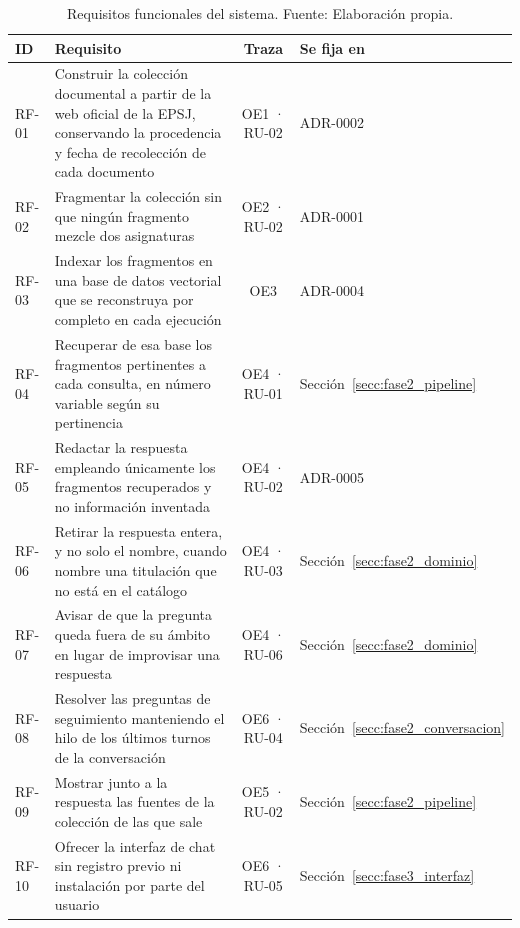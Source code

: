 \begin{table}[htbp]
  \centering
  \small
  \caption[Requisitos funcionales del sistema]{Requisitos funcionales del
    sistema. Fuente: Elaboración propia.}
  \label{tab:requisitos_funcionales}
  \begin{tabularx}{\textwidth}{@{}l >{\hsize}Y c >{\hsize}Y@{}}
    \toprule
    \textbf{ID} & \textbf{Requisito} & \textbf{Traza} & \textbf{Se fija en} \\
    \midrule
    RF-01 & Construir la colección documental a partir de la web oficial de la EPSJ, conservando la procedencia y fecha de recolección de cada documento                & OE1 · RU-02 & ADR-0002 \\
    RF-02 & Fragmentar la colección sin que ningún fragmento mezcle dos asignaturas                                                          & OE2 · RU-02 & ADR-0001 \\
    RF-03 & Indexar los fragmentos en una base de datos vectorial que se reconstruya por completo en cada ejecución                          & OE3         & ADR-0004 \\
    RF-04 & Recuperar de esa base los fragmentos pertinentes a cada consulta, en número variable según su pertinencia                        & OE4 · RU-01 & Sección~\ref{secc:fase2_pipeline} \\
    RF-05 & Redactar la respuesta empleando únicamente los fragmentos recuperados y no información inventada                                 & OE4 · RU-02 & ADR-0005 \\
    RF-06 & Retirar la respuesta entera, y no solo el nombre, cuando nombre una titulación que no está en el catálogo                        & OE4 · RU-03 & Sección~\ref{secc:fase2_dominio} \\
    RF-07 & Avisar de que la pregunta queda fuera de su ámbito en lugar de improvisar una respuesta                                          & OE4 · RU-06 & Sección~\ref{secc:fase2_dominio} \\
    RF-08 & Resolver las preguntas de seguimiento manteniendo el hilo de los últimos turnos de la conversación                              & OE6 · RU-04 & Sección~\ref{secc:fase2_conversacion} \\
    RF-09 & Mostrar junto a la respuesta las fuentes de la colección de las que sale                                                         & OE5 · RU-02 & Sección~\ref{secc:fase2_pipeline} \\
    RF-10 & Ofrecer la interfaz de chat sin registro previo ni instalación por parte del usuario                                          & OE6 · RU-05 & Sección~\ref{secc:fase3_interfaz} \\

\end{tabularx}
\end{table}
